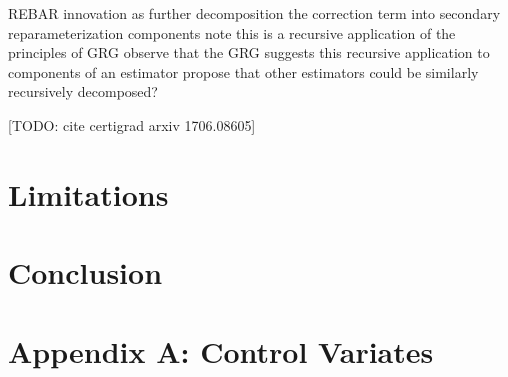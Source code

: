 \documentclass{article}
\begin{document}
REBAR innovation as further decomposition the correction term into secondary reparameterization components
note this is a recursive application of the principles of GRG
observe that the GRG suggests this recursive application to components of an estimator
propose that other estimators could be similarly recursively decomposed?


[TODO: cite certigrad arxiv 1706.08605]



\section{Limitations}
\label{limitation}

\section{Conclusion}
\label{conclusion}






\section{Appendix A: Control Variates}






\end{document}
